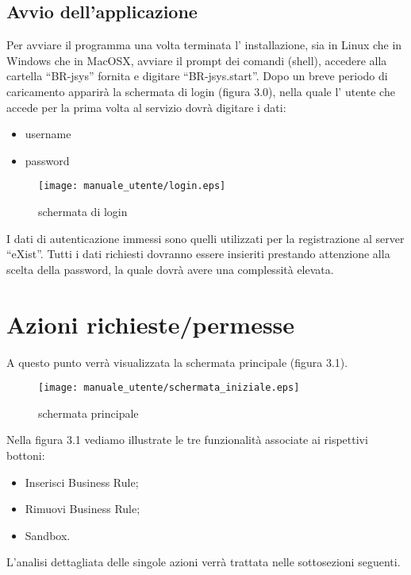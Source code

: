 \subsection{Avvio dell'applicazione}
Per avviare il programma una volta terminata l' installazione, sia in Linux che in Windows che in MacOSX, avviare il prompt dei comandi (shell), accedere alla cartella ``BR-jsys'' fornita e digitare ``BR-jsys.start''. Dopo un breve periodo di caricamento apparir\`a la schermata di login (figura 3.0), nella quale l' utente che accede per la prima volta al servizio dovr\`a digitare i dati: 
\begin{itemize}
\item username
\item password
\end{itemize}
\begin{figure}[htbp]
\begin{center}
\texttt{[image: manuale\_utente/login.eps]}
\end{center}
\caption{schermata di login}
\label{figura 3.0}
\end{figure}
I dati di autenticazione immessi sono quelli utilizzati per la registrazione al server ``eXist''. Tutti i dati richiesti dovranno essere insieriti prestando attenzione alla scelta della password, la quale dovr\`a avere una complessit\`a elevata. 

\section{Azioni richieste/permesse}
A questo punto verr\`a visualizzata la schermata principale (figura 3.1).
\begin{figure}[htbp]
\begin{center}
\texttt{[image: manuale\_utente/schermata\_iniziale.eps]}
\end{center}
\caption{schermata principale}
\label{figura 3.1}
\end{figure}
Nella figura 3.1 vediamo illustrate le tre funzionalit\`a associate ai rispettivi bottoni:
\begin{itemize}
\item Inserisci Business Rule;
\item Rimuovi Business Rule;
\item Sandbox.
\end{itemize}
L'analisi dettagliata delle singole azioni verr\`a trattata nelle sottosezioni seguenti.
